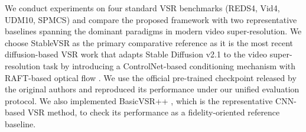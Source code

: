 \begin{table}[htbp]
\caption{Quantitative comparison on cross-dataset evaluation 
sets (Vid4, UDM10, SPMCS).}
\centering
{}
\label{tab:accuracy_cross}
\end{table}

We conduct experiments on four standard VSR benchmarks (REDS4, 
Vid4, UDM10, SPMCS) and compare the proposed framework with 
two representative baselines spanning the dominant paradigms 
in modern video super-resolution. We choose StableVSR 
\cite{rota2024stablevsr} as the primary comparative reference 
as it is the most recent diffusion-based VSR work that adapts 
Stable Diffusion v2.1 \cite{rombach2022ldm} to the video 
super-resolution task by introducing a ControlNet-based 
conditioning mechanism with RAFT-based optical flow 
\cite{teed2020raft}. We use the official pre-trained checkpoint 
released by the original authors and reproduced its performance 
under our unified evaluation protocol. We also implemented 
BasicVSR++ \cite{chan2022basicvsrplusplus}, which is the 
representative CNN-based VSR method, to check its performance 
as a fidelity-oriented reference baseline.

